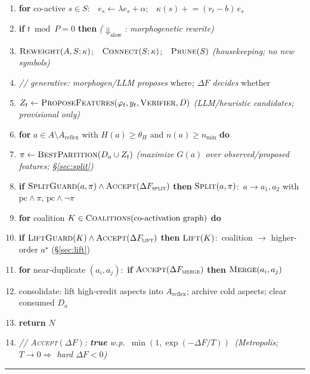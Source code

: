 \documentclass[11pt]{article}
\theoremstyle{definition}
\begin{document}
\begin{algorithm}[t]
\begin{enumerate}[leftmargin=2.9em,itemsep=1.5pt,topsep=2pt,parsep=0pt,label=\textup{\arabic*:}]
\item \hspace{1.2em}\textbf{for} co-active $s\in S$:\ \ $e_s\gets\lambda e_s+\alpha$;\ \ $\kappa(s)\mathrel{+}=(r_t-b)\,e_s$
\item \hspace{1.2em}\textbf{if} $t\bmod P=0$ \textbf{then} \quad\emph{($\Downarrow_\text{slow}$: morphogenetic rewrite)}
\item \hspace{2.4em}$\textsc{Reweight}(A,S;\kappa)$;\ \ $\textsc{Connect}(S;\kappa)$;\ \ $\textsc{Prune}(S)$ \quad\emph{(housekeeping; no new symbols)}
\item \hspace{2.4em}\emph{// generative: morphogen/LLM proposes} where\emph{; $\Delta F$ decides} whether
\item \hspace{2.4em}$Z_t\gets\textsc{ProposeFeatures}(\varphi_t,y_t,\textsc{Verifier},D)$ \quad\emph{(LLM/heuristic candidates; provisional only)}
\item \hspace{2.4em}\textbf{for} $a\in A\setminus A_\text{reflex}$ with $H(a)\ge\theta_H$ and $n(a)\ge n_\text{min}$ \textbf{do}
\item \hspace{3.6em}$\pi\gets\textsc{BestPartition}(D_a\cup Z_t)$ \quad\emph{(maximize $G(a)$ over observed/proposed features; \S\ref{sec:split})}
\item \hspace{3.6em}\textbf{if} $\textsc{SplitGuard}(a,\pi)\wedge\textsc{Accept}(\Delta F_{\textsc{split}})$ \textbf{then} $\textsc{Split}(a,\pi)$:\ $a\!\to\!a_1,a_2$ with $\mathrm{pc}\wedge\pi,\,\mathrm{pc}\wedge\neg\pi$
\item \hspace{2.4em}\textbf{for} coalition $K\in\textsc{Coalitions}(\text{co-activation graph})$ \textbf{do}
\item \hspace{3.6em}\textbf{if} $\textsc{LiftGuard}(K)\wedge\textsc{Accept}(\Delta F_{\textsc{lift}})$ \textbf{then} $\textsc{Lift}(K)$:\ coalition $\to$ higher-order $a^\star$ (\S\ref{sec:lift})
\item \hspace{2.4em}\textbf{for} near-duplicate $(a_i,a_j)$:\ \textbf{if} $\textsc{Accept}(\Delta F_{\textsc{merge}})$ \textbf{then} $\textsc{Merge}(a_i,a_j)$
\item \hspace{2.4em}consolidate: lift high-credit aspects into $A_\text{reflex}$; archive cold aspects; clear consumed $D_a$
\item \textbf{return} $N$
\item \emph{// \textsc{Accept}$(\Delta F)$: \textbf{true} w.p.\ $\min(1,\exp(-\Delta F/T))$ \,(Metropolis; $T\!\to\!0\Rightarrow$ hard $\Delta F<0$)}
\end{enumerate}
\vspace{1pt}\hrule
\end{algorithm}
\end{document}
